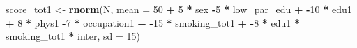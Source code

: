 \documentclass[
]{book}
\newenvironment{Shaded}{\begin{snugshade}}{\end{snugshade}}
\newcommand{\AttributeTok}[1]{\textcolor[rgb]{0.13,0.29,0.53}{#1}}
\newcommand{\DecValTok}[1]{\textcolor[rgb]{0.00,0.00,0.81}{#1}}
\newcommand{\FunctionTok}[1]{\textcolor[rgb]{0.13,0.29,0.53}{\textbf{#1}}}
\newcommand{\NormalTok}[1]{#1}
\newcommand{\OtherTok}[1]{\textcolor[rgb]{0.56,0.35,0.01}{#1}}
\newcommand{\SpecialCharTok}[1]{\textcolor[rgb]{0.81,0.36,0.00}{\textbf{#1}}}
\begin{document}
\begin{Shaded}
\begin{Highlighting}[]
\NormalTok{  score\_tot1 }\OtherTok{\textless{}{-}} \FunctionTok{rnorm}\NormalTok{(N, }\AttributeTok{mean =} \DecValTok{50} \SpecialCharTok{+} \DecValTok{5} \SpecialCharTok{*}\NormalTok{ sex  }\SpecialCharTok{{-}}\DecValTok{5} \SpecialCharTok{*}\NormalTok{ low\_par\_edu }\SpecialCharTok{+} 
                        \SpecialCharTok{{-}}\DecValTok{10} \SpecialCharTok{*}\NormalTok{ edu1 }\SpecialCharTok{+} \DecValTok{8} \SpecialCharTok{*}\NormalTok{ phys1 }\SpecialCharTok{{-}}\DecValTok{7} \SpecialCharTok{*}\NormalTok{ occupation1 }\SpecialCharTok{+} 
                        \SpecialCharTok{{-}}\DecValTok{15} \SpecialCharTok{*}\NormalTok{ smoking\_tot1 }\SpecialCharTok{+} \SpecialCharTok{{-}}\DecValTok{8} \SpecialCharTok{*}\NormalTok{ edu1 }\SpecialCharTok{*}\NormalTok{ smoking\_tot1 }\SpecialCharTok{*}\NormalTok{ inter, }
                      \AttributeTok{sd =} \DecValTok{15}\NormalTok{)}
                   

\end{Highlighting}
\end{Shaded}
\end{document}
